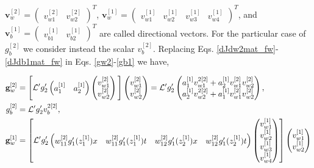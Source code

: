 \documentclass{article}
\begin{document}
$\textbf{v}_w^{[2]} = 
\begin{pmatrix}
v_{w1}^{[2]}& v_{w2}^{[2]}
\end{pmatrix}^T$, 
$\textbf{v}_w^{[1]} = 
\begin{pmatrix}
v_{w1}^{[1]}& v_{w2}^{[1]} & v_{w3}^{[1]} & v_{w4}^{[1]}
\end{pmatrix}^T$, and $\textbf{v}_b^{[1]} = 
\begin{pmatrix}
v_{b1}^{[1]}& v_{b2}^{[1]}
\end{pmatrix}^T$ are called directional vectors. For the particular case of $g_b^{[2]}$ we consider instead the scalar $v_b^{[2]}$. Replacing Eqs. \eqref{dJdw2mat_fw}-\eqref{dJdb1mat_fw} in Eqs. \eqref{gw2}-\eqref{gb1} we have,

\begin{align}
\label{dJdw2mat_fw3}
\textbf{g}_w^{[2]} &= 
\Bigg{[} \mathcal{L}'
g_2'
\begin{pmatrix}
a_1^{[1]} & a_2^{[1]} 
\end{pmatrix}
\begin{pmatrix}
v_{w1}^{[2]}\\ v_{w2}^{[2]}
\end{pmatrix}\Bigg{]}
\begin{pmatrix}
v_{w1}^{[2]}\\ v_{w2}^{[2]}
\end{pmatrix} =
\mathcal{L}'
g_2' 
\begin{pmatrix}
a_1^{[1]} v_{w1}^{2[2]} + a_2^{[1]}v_{w1}^{[2]} v_{w2}^{[2]} \\ 
a_2^{[1]}v_{w2}^{2[2]} + a_1^{[1]} v_{w1}^{[2]}v_{w2}^{[2]}  
\end{pmatrix}, \\
\label{db2_gradf}
g_b^{[2]} &=
\mathcal{L}'
g_2' v_b^{2[2]},\\
\textbf{g}_w^{[1]} &= 
\left[\mathcal{L}'
g_2'
\begin{pmatrix}
w_{11}^{[2]}  g_1'(z_1^{[1]}) x & w_{11}^{[2]} g_1'(z_1^{[1]}) t & w_{12}^{[2]} g_1'(z_2^{[1]}) x &  w_{12}^{[2]} g_1'(z_2^{[1]}) t
\end{pmatrix} 
\begin{pmatrix}
v_{w1}^{[1]} \\
v_{w2}^{[1]} \\
v_{w3}^{[1]} \\
v_{w4}^{[1]}
\end{pmatrix}\right] 
\begin{pmatrix}
v_{w1}^{[1]} \\
v_{w2}^{[1]} \\

\end{pmatrix}
\end{align}
\end{document}
